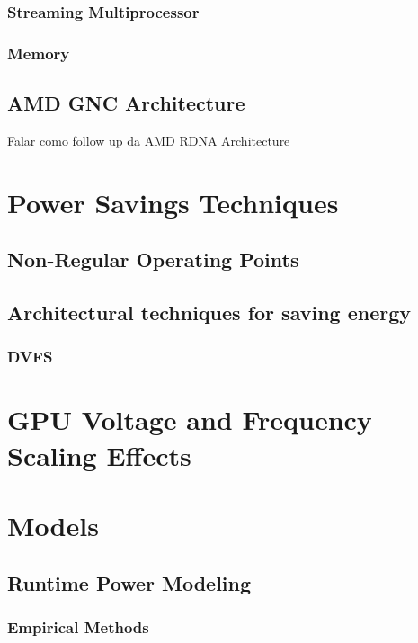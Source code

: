\subsubsection{Streaming Multiprocessor}
\subsubsection{Memory }
\subsection{AMD GNC Architecture}

Falar como follow up da AMD RDNA Architecture
\section{Power Savings Techniques}
\label{section:overview}

\subsection{Non-Regular Operating Points}

\subsection{Architectural techniques for saving energy}

\subsubsection{DVFS}
\label{section:dvfs}


\section{GPU Voltage and Frequency Scaling Effects}
\label{section:solarch}
\section{Models}
\subsection{Runtime Power Modeling}
\label{section:powermodels}
\subsubsection{Empirical Methods}
